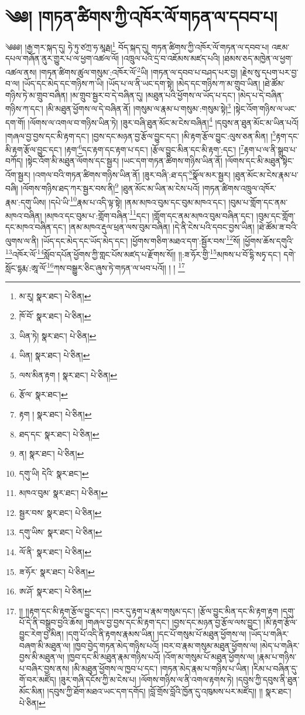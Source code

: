 \setcounter{footnote}{0} 
\chapter{༄༅། །གཏན་ཚིགས་ཀྱི་འཁོར་ལོ་གཏན་ལ་དབབ་པ།}༄༅༅། །རྒྱ་གར་སྐད་དུ། ཧེ་ཏུ་ཙཀྲ་ཧ་མཱརྠ།\footnote{མ་རུ།  སྣར་ཐང་།  པེ་ཅིན། } བོད་སྐད་དུ། གཏན་ཚིགས་ཀྱི་འཁོར་ལོ་གཏན་ལ་དབབ་པ། འཇམ་དཔལ་གཞོན་ནུར་གྱུར་པ་ལ་ཕྱག་འཚལ་ལོ། །འཁྲུལ་པའི་དྲ་བ་འཇོམས་མཛད་པའི། །ཐམས་ཅད་མཁྱེན་ལ་ཕྱག་འཚལ་ནས། །གཏན་ཚིགས་ཚུལ་གསུམ་:འཁོར་ལོ་\footnote{ཁོ་བོ་  སྣར་ཐང་།  པེ་ཅིན། }ཡི། །གཏན་ལ་དབབ་པ་བཤད་པར་བྱ། །རྗེས་སུ་དཔག་པར་བྱ་བ་ལ། །ཡོད་དང་མེད་དང་གཉིས་ཀ་ཡི། །ཡོད་པ་ལ་ནི་ཡང་དག་སྟེ། །མེད་དང་གཉིས་ཀ་མ་གྲུབ་ཡིན། །ཐེ་ཚོམ་གཉིས་ཏེ་མ་གྲུབ་བཞིན། །མ་གྲུབ་སྦྱར་བ་དེ་བཞིན་དུ། །མཐུན་པའི་ཕྱོགས་ལ་ཡོད་པ་དང་། །མེད་པ་དེ་བཞིན་གཉིས་ཀ་དང་། །མི་མཐུན་ཕྱོགས་ལ་དེ་བཞིན་ནོ། །གསུམ་ལ་རྣམ་པ་གསུམ་:གསུམ་སྟེ།\footnote{ཡིན་ཏེ།  སྣར་ཐང་།  པེ་ཅིན། } །སྟེང་འོག་གཉིས་ལ་ཡང་དག་གོ། །ལོགས་ལ་འགལ་བ་གཉིས་ཡིན་ཏེ། །ཟུར་བཞི་ཐུན་མོང་མ་ངེས་བཞིན།\footnote{ཡིན།  སྣར་ཐང་།  པེ་ཅིན། } །དབུས་ན་ཐུན་མོང་མ་ཡིན་པའོ། །གཞལ་བྱ་བྱས་དང་མི་རྟག་དང་། །བྱས་དང་མཉན་བྱ་རྩོལ་བྱུང་དང་། །མི་རྟག་རྩོལ་བྱུང་:ལུས་ཅན་མིན། །\footnote{ལས་མིན་རྟག །  སྣར་ཐང་།  པེ་ཅིན། }རྟག་དང་མི་རྟག་རྩོལ་བྱུང་དང་། །རྟག་\footnote{རྩོལ་  སྣར་ཐང་། }དང་རྟག་དང་རྟག་པ་དང་། །རྩོལ་བྱུང་མིན་དང་མི་རྟག་:དང་། །\footnote{རྟག །  སྣར་ཐང་།  པེ་ཅིན། }རྟག་པ་ལ་ནི་སྒྲུབ་པ་བཀོད། །སྟེང་འོག་མི་མཐུན་ལོགས་དང་སྦྱར། །ཡང་དག་གཏན་ཚིགས་གཉིས་ཡིན་ནོ། །ལོགས་དང་མི་མཐུན་སྟེང་འོག་སྦྱར། །འགལ་བའི་གཏན་ཚིགས་གཉིས་ཡིན་ནོ། །ཟུར་བཞི་:ཐ་དད་\footnote{ཐད་དང་  སྣར་ཐང་།  པེ་ཅིན། }སྣོལ་མར་སྦྱར། །ཐུན་མོང་མ་ངེས་རྣམ་པ་བཞི། །ལོགས་གཉིས་ཐད་ཀར་སྦྱར་བས་ནི།\footnote{ན།  སྣར་ཐང་།  པེ་ཅིན། } །ཐུན་མོང་མ་ཡིན་མ་ངེས་པའོ། །གཏན་ཚིགས་འཁྲུལ་འཁོར་རྣམ་:དགུ་ཡིས། །དཔེ་ཡི་\footnote{དགུ་ཡི། དེའི་  སྣར་ཐང་། }རྣམ་པ་འདི་ལྟ་སྟེ། །ནམ་མཁའ་བུམ་དང་བུམ་མཁའ་དང་། །བུམ་པ་གློག་དང་ནམ་མཁའ་བཞིན། །མཁའ་དང་བུམ་པ་:གློག་བཞིན་\footnote{མཁའ་བུམ་  སྣར་ཐང་།  པེ་ཅིན། }དང་། །གློག་དང་ནམ་མཁའ་བུམ་བཞིན་དང་། །བུམ་དང་གློག་དང་མཁའ་བཞིན་དང་། །ནམ་མཁའ་རྡུལ་ཕྲན་ལས་བུམ་བཞིན། །དེ་ནི་ངེས་པའི་དབང་བྱས་ཡིན། །ཐེ་ཚོམ་ཟ་བའི་ལུགས་ལ་ནི། །ཡོད་དང་མེད་དང་ཡོད་མེད་དང་། །ཕྱོགས་གཅིག་མཐའ་དག་:སྦྱོར་བས་\footnote{སྦྱར་བས་  སྣར་ཐང་།  པེ་ཅིན། }སོ། །ཕྱོགས་ཆོས་དགུའི་\footnote{དགུ་ཡིས་  སྣར་ཐང་།  པེ་ཅིན། }འཁོར་ལོ་\footnote{ལོ་ནི་  སྣར་ཐང་།  པེ་ཅིན། }སློབ་དཔོན་ཕྱོགས་ཀྱི་གླང་པོས་མཛད་པ་རྫོགས་སོ།། །།:ཟ་ཧོར་གྱི་\footnote{ཟ་ཧོར་  སྣར་ཐང་།  པེ་ཅིན། }མཁས་པ་བོ་དྷི་སཏྭ་དང་། དགེ་སློང་དྷརྨ་:ཨཱ་ལོ་\footnote{ཨ་ཤོ་  སྣར་ཐང་།  པེ་ཅིན། }ཀས་བསྒྱུར་ཅིང་ཞུས་ཏེ་གཏན་ལ་ཕབ་པའོ།། །
། \footnote{།། །།རྟག་དང་མི་རྟག་རྩོལ་བྱུང་དང་། །བར་དུ་རྟག་པ་རྣམ་གསུམ་དང་། །རྩོལ་བྱུང་མིན་དང་མི་རྟག་རྟག །དགུ་པོ་དེ་ནི་བསྒྲུབ་བྱའི་ཆོས། །གཞལ་བྱ་བྱས་དང་མི་རྟག་དང་། །བྱས་དང་མཉན་བྱ་རྩོལ་ལས་བྱུང་། །མི་རྟག་རྩོལ་བྱུང་རེག་བྱ་མིན། །དགུ་པོ་འདི་ནི་རྟགས་རྣམས་ཡིན། །དང་པོ་གསུམ་པོ་མཐུན་ཕྱོགས་ལ། །ཡོད་པ་གཞིར་བཞག་མི་མཐུན་ལ། །ཁྱབ་བྱེད་གཏན་མེད་གཉིས་པའོ། །བར་བ་རྣམ་གསུམ་མཐུན་ཕྱོགས་ལ། །མེད་པ་གཞིར་བྱས་མི་མཐུན་ལ། །ཁྱབ་དང་མི་མཐུན་རྣམ་གཉིས་པའོ། །འོག་མ་གསུམ་པོ་མཐུན་ཕྱོགས་ལ། །རྣམ་པ་གཉིས་པ་བཞིར་བྱས་ནས། །མི་མཐུན་ཕྱོགས་ལ་ཁྱབ་པ་དང་། །གཏན་མེད་རྣམ་པ་གཉིས་པ་ཡིན། །རིམ་པ་བཞིན་དུ་གོ་བར་མཛོད། །ཟུར་གཞི་དངོས་ཀྱི་མ་ངེས་པ། །ལོགས་གཉིས་ལ་ནི་འགལ་རྟགས་ཏེ། །དབུས་ཀྱི་དབུས་ནི་ཐུན་མོང་མིན། །དབུས་ཀྱི་ཐོག་མཐའ་ཡང་དག་དགོད། །བློ་གྲོས་བློའི་ཁྱོན་དུ་འཁུམས་པར་མཛོད།། །།   སྣར་ཐང་།  པེ་ཅིན། }